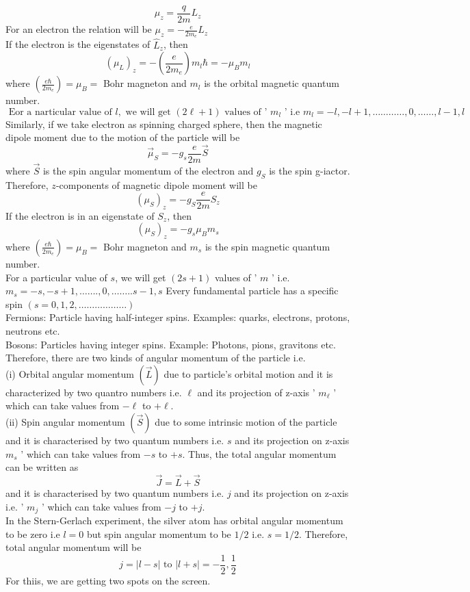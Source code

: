 $$
\mu_{z}=\frac{q}{2 m} L_{z}
$$
For an electron the relation will be $\mu_{z}=-\frac{e}{2 m_{e}} L_{z}$\\
If the electron is the eigenstates of $\hat{L}_{z}$, then
$$
\left(\mu_{L}\right)_{z}=-\left(\frac{e}{2 m_{e}}\right) m_{l} \hbar=-\mu_{B} m_{l}
$$
where $\left(\frac{e \hbar}{2 m_{e}}\right)=\mu_{B}=$ Bohr magneton and $m_{l}$ is the orbital magnetic quantum number.\\
$\text { Eor a narticular value of } l, \text { we will get }(2 \ell+1) \text { values of ' } m_{l} \text { ' i.e } m_{l}=-l,-l+1, \ldots \ldots \ldots \ldots, 0, \ldots \ldots, l-1, l$\\
Similarly, if we take electron as spinning charged sphere, then the magnetic dipole moment due to the motion of the particle will be
$$
\vec{\mu}_{S}=-g_{s} \frac{e}{2 m} \vec{S}
$$
where $\vec{S}$ is the spin angular momentum of the electron and $g_{S}$ is the spin g-iactor. Therefore, $z$-components of magnetic dipole moment will be
$$
\left(\mu_{S}\right)_{z}=-g_{S} \frac{e}{2 m} S_{z}
$$
If the electron is in an eigenstate of $S_{z}$, then
$$
\left(\mu_{S}\right)_{z}=-g_{s} \mu_{B} m_{s}
$$
where $\left(\frac{e \hbar}{2 m_{e}}\right)=\mu_{B}=$ Bohr magneton and $m_{s}$ is the spin magnetic quantum number.\\
For a particular value of $s$, we will get $(2 s+1)$ values of ' $m$ ' i.e. $m_{s}=-s,-s+1, \ldots \ldots ., 0, \ldots \ldots . . s-1, s$ Every fundamental particle has a specific spin $(s=0,1,2, \ldots \ldots \ldots \ldots \ldots \ldots)$\\
Fermions: Particle having half-integer spins. Examples: quarks, electrons, protons, neutrons etc.\\
 Bosons: Particles having integer spins. Example: Photons, pions, gravitons etc.\\
 Therefore, there are two kinds of angular momentum of the particle i.e.\\
 (i) Orbital angular momentum $(\vec{L})$ due to particle's orbital motion and it is characterized by two quantro numbers i.e. $\ell$ and its projection of z-axis ' $m_{\ell}$ ' which can take values from $-\ell$ to $+\ell$.\\
 (ii) Spin angular momentum $(\vec{S})$ due to some intrinsic motion of the particle and it is characterised by two quantum numbers i.e. $s$ and its projection on z-axis $m_{s}$ ' which can take values from $-s$ to $+s$. Thus, the total angular momentum can be written as
 $$ \vec{J}=\vec{L}+\vec{S} $$ and it is characterised by two quantum numbers i.e. $j$ and its projection on z-axis i.e. ' $m_{j}$ ' which can take values from $-j$ to $+j$.\\
 In the Stern-Gerlach experiment, the silver atom has orbital angular momentum to be zero i.e $l=0$ but spin angular momentum to be $1 / 2$ i.e. $s=1 / 2$. Therefore, total angular momentum will be
 $$
 j=|l-s| \text { to }|l+s|=-\frac{1}{2}, \frac{1}{2}
 $$
 For thiis, we are getting two spots on the screen.\\
